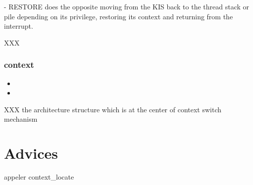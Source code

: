 - RESTORE does the opposite moving from the KIS back to the thread stack
 or pile depending on its privilege, restoring its context and returning from
 the interrupt.

XXX

\subsubsection*{context}

\begin{itemize}
  \item
  \item
\end{itemize}

XXX the architecture structure which is at the center of context switch
 mechanism

%
%

\section{Advices}

  appeler context\_locate
